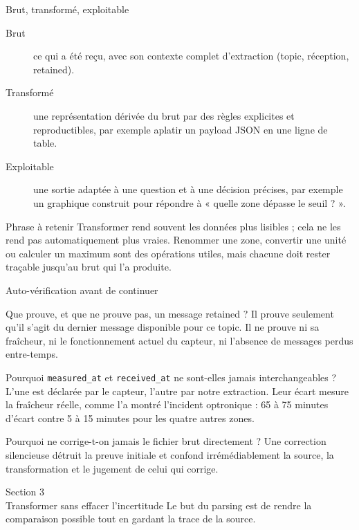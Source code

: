 \documentclass[aspectratio=169]{beamer}
\begin{document}
\begin{frame}{Brut, transformé, exploitable}
  \begin{description}
    \item[Brut] ce qui a été reçu, avec son contexte complet d'extraction (topic, réception, retained).
    \item[Transformé] une représentation dérivée du brut par des règles explicites et reproductibles, par exemple aplatir un payload JSON en une ligne de table.
    \item[Exploitable] une sortie adaptée à une question et à une décision précises, par exemple un graphique construit pour répondre à « quelle zone dépasse le seuil ? ».
  \end{description}
  \begin{block}{Phrase à retenir}
    Transformer rend souvent les données plus lisibles ; cela ne les rend pas automatiquement plus vraies. Renommer une zone, convertir une unité ou calculer un maximum sont des opérations utiles, mais chacune doit rester traçable jusqu'au brut qui l'a produite.
  \end{block}
\end{frame}

\begin{frame}{Auto-vérification avant de continuer}
  \small
  \begin{block}{Que prouve, et que ne prouve pas, un message retained ?}
    Il prouve seulement qu'il s'agit du dernier message disponible pour ce topic. Il ne prouve ni sa fraîcheur, ni le fonctionnement actuel du capteur, ni l'absence de messages perdus entre-temps.
  \end{block}
  \begin{block}{Pourquoi \texttt{measured\_at} et \texttt{received\_at} ne sont-elles jamais interchangeables ?}
    L'une est déclarée par le capteur, l'autre par notre extraction. Leur écart mesure la fraîcheur réelle, comme l'a montré l'incident optronique : 65 à 75 minutes d'écart contre 5 à 15 minutes pour les quatre autres zones.
  \end{block}
  \begin{block}{Pourquoi ne corrige-t-on jamais le fichier brut directement ?}
    Une correction silencieuse détruit la preuve initiale et confond irrémédiablement la source, la transformation et le jugement de celui qui corrige.
  \end{block}
\end{frame}

\begin{frame}[plain]
  \centering
  \Huge Section 3\\[3mm]
  \Large Transformer sans effacer l'incertitude
  \vfill
  \normalsize Le but du parsing est de rendre la comparaison possible tout en gardant la trace de la source.
\end{frame}
\end{document}

